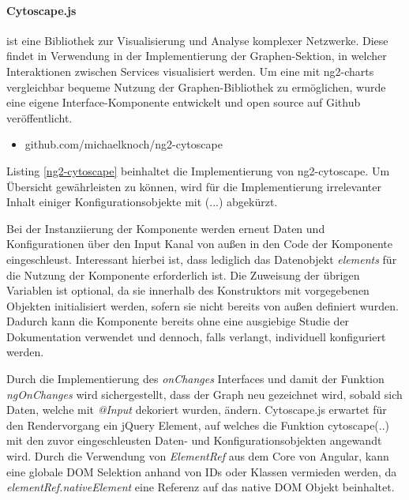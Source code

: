\paragraph{Cytoscape.js}
ist eine Bibliothek zur Visualisierung und Analyse komplexer Netzwerke.
Diese findet in \projectname{} Verwendung in der Implementierung der Graphen-Sektion,
in welcher Interaktionen zwischen Services visualisiert werden.
Um eine mit ng2-charts vergleichbar bequeme Nutzung der Graphen-Bibliothek zu ermöglichen,
wurde eine eigene Interface-Komponente entwickelt und open source auf Github veröffentlicht.

\begin{itemize}
  \item{github.com/michaelknoch/ng2-cytoscape}
\end{itemize}



\noindent Listing \ref{ng2-cytoscape} beinhaltet die Implementierung von ng2-cytoscape.
Um Übersicht gewährleisten zu können, wird für die Implementierung irrelevanter Inhalt einiger Konfigurationsobjekte mit (...) abgekürzt.

Bei der Instanziierung der Komponente werden erneut Daten und Konfigurationen über den Input Kanal von außen
in den Code der Komponente eingeschleust. Interessant hierbei ist,
dass lediglich das Datenobjekt \emph{elements} für die Nutzung der Komponente erforderlich ist.
Die Zuweisung der übrigen Variablen ist optional, da sie innerhalb des Konstruktors mit vorgegebenen Objekten initialisiert werden, sofern sie nicht bereits von außen definiert wurden.
Dadurch kann die Komponente bereits ohne eine ausgiebige Studie der Dokumentation verwendet und dennoch, falls verlangt, individuell konfiguriert werden.

Durch die Implementierung des \emph{onChanges} Interfaces und damit der Funktion \emph{ngOnChanges} wird sichergestellt,
dass der Graph neu gezeichnet wird, sobald sich Daten, welche mit \emph{@Input} dekoriert wurden, ändern.
Cytoscape.js erwartet für den Rendervorgang ein jQuery Element, auf welches die Funktion cytoscape({..})
mit den zuvor eingeschleusten Daten- und Konfigurationsobjekten angewandt wird.
Durch die Verwendung von \emph{ElementRef} aus dem Core von Angular, kann eine globale \ac{DOM} Selektion anhand von IDs oder Klassen vermieden werden, da \emph{elementRef.nativeElement} eine Referenz auf das native \ac{DOM} Objekt beinhaltet.

